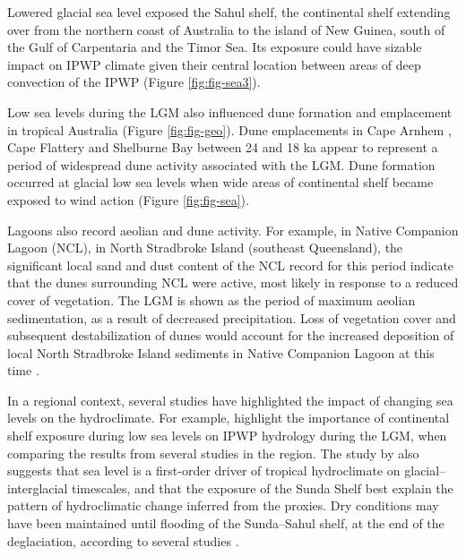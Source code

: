 \documentclass[
  12pt,
]{book}
\begin{document}
Lowered glacial sea level exposed the Sahul shelf, the continental shelf extending over from the northern coast of Australia to the island of New Guinea, south of the Gulf of Carpentaria and the Timor Sea. Its exposure could have sizable impact on IPWP climate given their central location between areas of deep convection of the IPWP \citep{dinezioClimateResponseIndo2016} (Figure \ref{fig:fig-sea3}).

Low sea levels during the LGM also influenced dune formation and emplacement in tropical Australia (Figure \ref{fig:fig-geo}). Dune emplacements in Cape Arnhem \citep{leesThermoluminescenceDatingDune1995}, Cape Flattery and Shelburne Bay between 24 and 18 ka appear to represent a period of widespread dune activity associated with the LGM. Dune formation occurred at glacial low sea levels when wide areas of continental shelf became exposed to wind action \citep{leesReconnaissanceThermoluminescenceDating1990, leesGeomorphologicalEvidenceLate1992a, leesTimingFormationCoastal2006} (Figure \ref{fig:fig-sea}).

Lagoons also record aeolian and dune activity. For example, in Native Companion Lagoon (NCL), in North Stradbroke Island (southeast Queensland), the significant local sand and dust content of the NCL record for this period indicate that the dunes surrounding NCL were active, most likely in response to a reduced cover of vegetation. The LGM is shown as the period of maximum aeolian sedimentation, as a result of decreased precipitation. Loss of vegetation cover and subsequent destabilization of dunes would account for the increased deposition of local North Stradbroke Island sediments in Native Companion Lagoon at this time \citep{petherickReconstructingTransportPathways2009, mcgowanAeolianSedimentationClimate2008}.

In a regional context, several studies have highlighted the impact of changing sea levels on the hydroclimate. For example, \citet{dinezioEffectSeaLevel2013a} highlight the importance of continental shelf exposure during low sea levels on IPWP hydrology during the LGM, when comparing the results from several studies in the region. The study by \citet{dinezioEffectSeaLevel2013a} also suggests that sea level is a first-order driver of tropical hydroclimate on glacial--interglacial timescales, and that the exposure of the Sunda Shelf best explain the pattern of hydroclimatic change inferred from the proxies. Dry conditions may have been maintained until flooding of the Sunda--Sahul shelf, at the end of the deglaciation, according to several studies \citep[e.g.~][]{dedeckkerStatusIndoPacificWarm2003, dinezioEffectSeaLevel2013a}.
\end{document}
